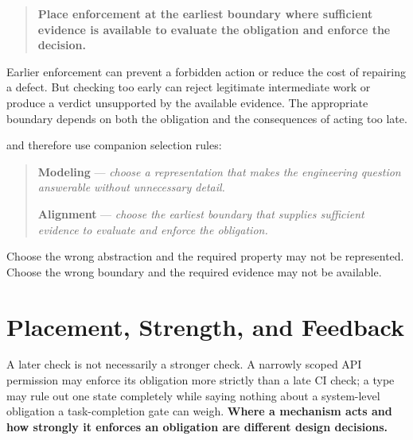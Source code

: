 \begin{quote}
\textbf{Place enforcement at the earliest boundary where sufficient evidence is available to evaluate the obligation and enforce the decision.}
\end{quote}

Earlier enforcement can prevent a forbidden action or reduce the cost of repairing a defect. But checking too early can reject legitimate intermediate work or produce a verdict unsupported by the available evidence. The appropriate boundary depends on both the obligation and the consequences of acting too late.


 and  therefore use companion selection rules:


\begin{quote}
\textbf{Modeling} --- \emph{choose a representation that makes the engineering question answerable without unnecessary detail.}

\textbf{Alignment} --- \emph{choose the earliest boundary that supplies sufficient evidence to evaluate and enforce the obligation.}
\end{quote}

Choose the wrong abstraction and the required property may not be represented. Choose the wrong boundary and the required evidence may not be available.


\section{Placement, Strength, and Feedback}\label{heading:placement-and-strength-are-different-decisions}



A later check is not necessarily a stronger check. A narrowly scoped API permission may enforce its obligation more strictly than a late CI check; a type may rule out one state completely while saying nothing about a system-level obligation a task-completion gate can weigh. \textbf{Where a mechanism acts and how strongly it enforces an obligation are different design decisions.}

